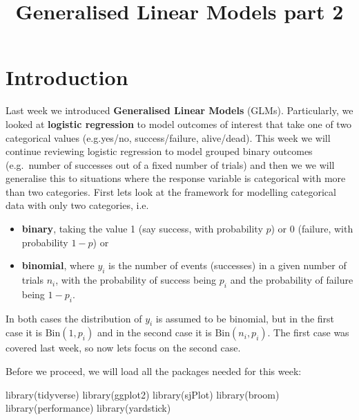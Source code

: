 \documentclass[
  letterpaper,
  DIV=11,
  numbers=noendperiod]{scrartcl}
\title{Generalised Linear Models part 2}
\author{}
\date{}
\makeatletter
\newenvironment{Shaded}{\begin{snugshade}}{\end{snugshade}}
\newcommand{\FunctionTok}[1]{\textcolor[rgb]{0.28,0.35,0.67}{#1}}
\newcommand{\NormalTok}[1]{\textcolor[rgb]{0.00,0.23,0.31}{#1}}
\renewcommand{\maketitle}{\bgroup\setlength{\parindent}{0pt}
\begin{flushleft}
  {\color{uniblue}\sffamily\huge\textbf{\@title}} \vspace{0.3cm} \newline
  {\Large {\@subtitle}} \newline
  \@author
\end{flushleft}\egroup
}
\makeatother
\begin{document}
\maketitle

\pagestyle{mystyle}

\section{Introduction}\label{introduction}

Last week we introduced \textbf{Generalised Linear Models} (GLMs).
Particularly, we looked at \textbf{logistic regression} to model
outcomes of interest that take one of two categorical values
(e.g.yes/no, success/failure, alive/dead). This week we will continue
reviewing logistic regression to model grouped binary outcomes
(e.g.~number of successes out of a fixed number of trials) and then we
we will generalise this to situations where the response variable is
categorical with more than two categories. First lets look at the
framework for modelling categorical data with only two categories, i.e.

\begin{itemize}
\item
  \textbf{binary}, taking the value 1 (say success, with probability
  \(p\)) or 0 (failure, with probability \(1-p\)) or
\item
  \textbf{binomial}, where \(y_i\) is the number of events (successes)
  in a given number of trials \(n_i\), with the probability of success
  being \(p_i\) and the probability of failure being \(1-p_i\).
\end{itemize}

In both cases the distribution of \(y_i\) is assumed to be binomial, but
in the first case it is \(\mathrm{Bin}(1,p_i)\) and in the second case
it is \(\mathrm{Bin}(n_i,p_i)\). The first case was covered last week,
so now lets focus on the second case.

Before we proceed, we will load all the packages needed for this week:

\begin{Shaded}
\begin{Highlighting}[]
\FunctionTok{library}\NormalTok{(tidyverse)}
\FunctionTok{library}\NormalTok{(ggplot2)}
\FunctionTok{library}\NormalTok{(sjPlot)}
\FunctionTok{library}\NormalTok{(broom)}
\FunctionTok{library}\NormalTok{(performance)}
\FunctionTok{library}\NormalTok{(yardstick)}
\end{Highlighting}
\end{Shaded}
\end{document}
